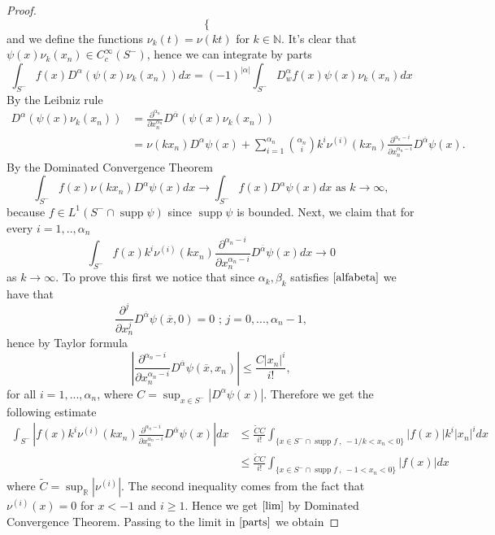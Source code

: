 \documentclass[12pt]{article}
\theoremstyle{definition}
\DeclareMathOperator\supp{supp}
\begin{document}
\begin{proof}
\[\begin{cases}
\end{cases} 
\]
and we define the functions $\nu_k(t)=\nu(kt)$ for $k \in \mathbb{N}$. It's clear that $\psi(x) \nu_k(x_n) \in C^\infty_c(S^-)$, hence we can integrate by parts
\begin{equation}\label{parts}
\int_{S^-}  f(x)D^{\alpha}(\psi(x) \nu_k(x_n)) dx = (-1)^{|\alpha|}\int_{S^-} D^\alpha_w f(x)\psi(x) \nu_k(x_n) dx  
\end{equation}
By the Leibniz rule 
\begin{align*}
D^{\alpha}(\psi(x) \nu_k(x_n)) &=\frac{\partial^{\alpha_n}}{\partial x_n^{\alpha_n}} D^{\overline \alpha}(\psi(x) \nu_k(x_n)) \\
				        &= \nu(kx_n)D^{\alpha}\psi(x)+\sum_{i=1}^{\alpha_n}  {{\alpha_n}  \choose {i} }  k^i \nu^{(i)}(kx_n)\frac{\partial^{\alpha_n-i}}{\partial x_n^{\alpha_n-i}} D^{\overline \alpha}\psi(x).
\end{align*}
By the Dominated Convergence Theorem
\[ \int_{S^-} f(x) \nu(kx_n)D^{\alpha}\psi(x)dx  \rightarrow \int_{S^-} f(x) D^{\alpha}\psi(x)dx \text{    as } k\rightarrow \infty,\]
because $f \in L^1(S^- \cap \supp \psi)$ since $\supp \psi$ is bounded.
Next, we claim that for every $i=1,..,\alpha_n$
\begin{equation}\label{lim}
\int_{S^-}  f(x) k^i \nu^{(i)}(kx_n)\frac{\partial^{\alpha_n-i}}{\partial x_n^{\alpha_n-i}} D^{\overline \alpha}\psi(x)dx  \rightarrow 0 
\end{equation}
as $k \rightarrow \infty$. To prove this first we notice that since  $\alpha_k,\beta_k$ satisfies $\eqref{alfabeta}$ we have that 
\[   \frac{\partial^j}{\partial x_n^j} D^{\overline \alpha}\psi(\overline x, 0)=0 \text{  ;  }j=0,...,\alpha_n-1,\]
hence by Taylor formula 
\[  \left| \frac{\partial^{\alpha_n - i}}{\partial x_n^{\alpha_n - i}} D^{\overline \alpha}\psi(\overline x, x_n) \right|  \le \frac{C|x_n|^i}{i!},\]
for all $i=1,...,\alpha_n$, where $C= \sup_{x \in   S^-} |D^{\alpha} \psi(x)|$. Therefore we get the following estimate
\begin{align*}
   	\int_{S^-}  \left|  f(x) k^i \nu^{(i)}(kx_n)\frac{\partial^{\alpha_n-i}}{\partial x_n^{\alpha_n-i}} D^{\overline \alpha}\psi(x)     \right |  dx  &\le 
	 \frac{\widetilde CC}{i!} \int_{ \{ x \in S^-\cap \supp f \ , \ -1/k< x_n<0 \} }   |f(x)| k^i |x_n|^i  dx  \\
	& \le \frac{\widetilde CC}{i!}   \int_{ \{ x \in S^-\cap \supp f \ ,\  -1< x_n<0 \} }   |f(x)| dx 
\end{align*}
where $\widetilde C = \sup_\mathbb{R} |\nu^{(i)}|$. The second inequality comes from the fact that $\nu^{(i)}(x)=0$ for $x<-1$ and $i\ge 1$. Hence we get $\eqref{lim}$ by Dominated Convergence Theorem. Passing to the limit in $\eqref{parts}$ we obtain

\end{proof}
\end{document}

